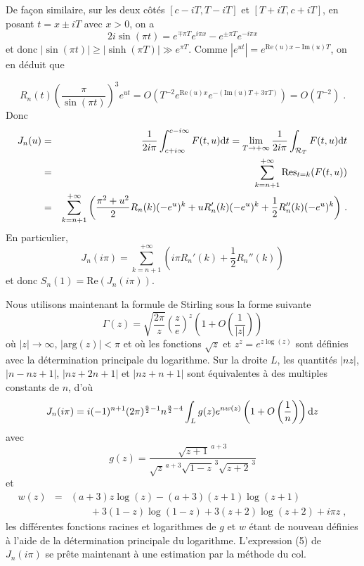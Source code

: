 \documentclass[12pt]{article}
\newcommand{\io}{+\infty}
\newcommand{\lm}{\left}
\newcommand{\rt}{\right}
\begin{document}
\noindent De fa\c{c}on similaire, sur les deux c\^ot\'es $[c-iT,T-iT]$ et
$[T+iT,c+iT]$,
en posant $t=x\pm iT$ avec $x>0$, on a
$$
2 i \sin(\pi t)=e^{\mp\pi T}e^{i\pi x}-e^{\pm\pi T}e^{-i\pi x}
$$
et donc $|\sin(\pi t)|\ge |\sinh(\pi T)|\gg e^{\pi T}$. Comme
$\lm|e^{ut}\rt|=e^{\text{Re}(u)x-\text{Im}(u)T}$, on en d\'eduit que

$$
R_n(t)\lm(\frac{\pi}{\sin(\pi t)}\rt)^3 e^{ut}
=O\lm(T^{-2}e^{\text{Re}(u)x}e^{-(\text{Im}(u)T+3\pi T)}\rt)=
O\lm(T^{-2}\rt)\;.
$$
Donc
\begin{eqnarray*}
J_n(u)&=&\frac{1}{2i\pi}
\int_{c+i\infty}^{c-i\infty} F(t,u) \textup{d}t=\lim_{T\to\io} \frac{1}{2i\pi}
\int_{\mathcal{R}_T} F(t,u)\textup{d}t\\
&=&\sum_{k=n+1}^{\io} \text{Res}_{t=k}(F(t,u))\\
&=&\sum_{k=n+1}^{\io} \lm(\frac{\pi^2+u^2}{2}R_n(k)(-e^u)^k
+uR_n'(k)(-e^u)^k+\frac{1}{2}R_n''(k)(-e^u)^k \rt)\,.
\end{eqnarray*}
En particulier,
$$
J_n(i\pi)=\sum_{k=n+1}^{\io} \lm(i\pi R_n'(k)+\frac{1}{2}R_n''(k)\rt)
$$
et donc $S_n(1)=\text{Re}(J_n(i\pi))$.\\ \null

Nous utilisons maintenant la formule de Stirling sous la forme suivante
$$
\Gamma(z)=\sqrt{\frac{2\pi}{z}}\lm(\frac{z}{e}\rt)^z\lm(1+O\lm(\frac{1 
}{|z|}\rt)\rt)
$$
o\`u $\vert z\vert \to\infty$, $\vert \text{arg}(z) \vert < \pi$ et o\`u
les fonctions
$\sqrt{z}$ et $z^z=e^{z\log(z)}$ sont d\'efinies avec la d\'etermination
principale du logarithme. Sur la droite $L$, les quantit\'es
$|nz|$, $|n-nz+1|$, $|nz+2n+1|$ et $|nz+n+1|$ sont
\'equivalentes \`a des multiples constants de $n$,
d'o\`u
\begin{eqnarray}
J_n(i\pi)=i(-1)^{n+1}(2\pi)^{\frac{a}{2}-1}n^{\frac{a}{2}-4}\int_L 
g(z)e^{nw(z)}
\lm(1+O\lm(\frac{1}{n}\rt)\rt)
\textup{d}z
\end{eqnarray}
avec
$$
g(z)=\frac{\sqrt{z+1}^{\,a+3}}
{\sqrt{z}^{\,a+3}\sqrt{1-z}^{\,3}\sqrt{z+2}^{\,3}}
$$
et
\begin{eqnarray*}
w(z)&=&(a+3)z\log(z)-(a+3)(z+1)\log(z+1)\\
&&\qquad +3(1-z)\log(1-z)+3(z+2)\log(z+2)+i\pi z\;,
\end{eqnarray*}
les diff\'erentes fonctions racines et logarithmes
de $g$ et $w$ \'etant de nouveau
d\'efinies \`a l'aide de la d\'etermination
principale du logarithme. L'expression (5)
de $J_n(i\pi)$ se pr\^ete maintenant
\`a une estimation par la m\'ethode du col.\\ \null
\end{document}
